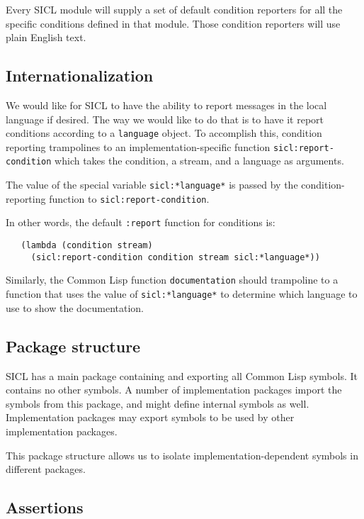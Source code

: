 \documentclass{article}
\def\sysname{SICL}
\begin{document}
Every \sysname{} module will supply a set of default condition
reporters for all the specific conditions defined in that module.
Those condition reporters will use plain English text. 

\subsection{Internationalization}

We would like for {\sysname} to have the ability to report messages in
the local language if desired.  The way we would like to do that is to
have it report conditions according to a \texttt{language} object.  To
accomplish this, condition reporting trampolines to an
implementation-specific function \texttt{sicl:report-condition} which
takes the condition, a stream, and a language as arguments.

The value of the special variable \texttt{sicl:*language*} is passed
by the condition-reporting function to \texttt{sicl:report-condition}.

In other words, the default \texttt{:report} function for conditions is:

\begin{verbatim}
   (lambda (condition stream) 
     (sicl:report-condition condition stream sicl:*language*))
\end{verbatim}

Similarly, the Common Lisp function \texttt{documentation} should
trampoline to a function that uses the value of
\texttt{sicl:*language*} to determine which language to use to show
the documentation. 

\subsection{Package structure}

{\sysname} has a main package containing and exporting all Common Lisp
symbols.  It contains no other symbols.  A number of implementation
packages import the symbols from this package, and might define
internal symbols as well.  Implementation packages may export symbols
to be used by other implementation packages.

This package structure allows us to isolate implementation-dependent
symbols in different packages.  

\subsection{Assertions}
\end{document}
